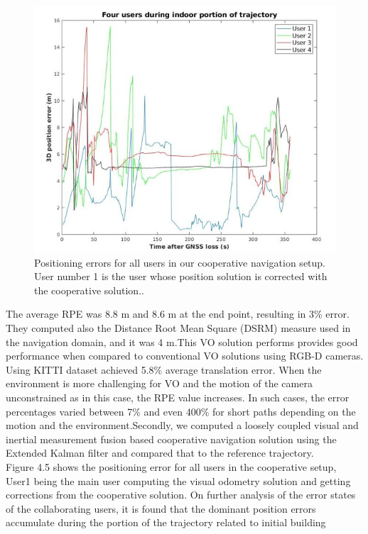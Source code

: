 \begin{figure}
    \centering
    \includegraphics{fig15.jpg}
    \caption{Positioning errors for all users in our cooperative navigation
setup. User number 1 is the user whose position solution is corrected
with the cooperative solution..}
\end{figure}
The
average RPE was 8.8 m and 8.6 m at the end point, resulting
in 3\% error. They computed also the Distance Root Mean
Square (DSRM) measure used in the navigation domain, and
it was 4 m.This VO solution performs provides good performance
when compared to conventional VO solutions using RGB-D
cameras. Using KITTI dataset achieved 5.8\% average
translation error. When the environment is more challenging
for VO and the motion of the camera unconstrained as in
this case, the RPE value increases. In such cases, the error percentages varied between 7\% and even 400\% for short paths
depending on the motion and the environment.Secondly, we computed a loosely coupled visual and inertial
measurement fusion based cooperative navigation solution
using the Extended Kalman filter and
compared that to the reference trajectory.\\
Figure 4.5 shows the positioning error for all users in the cooperative setup,
User1 being the main user computing the visual odometry
solution and getting corrections from the cooperative solution.
On further analysis of the error states of the collaborating
users, it is found that the dominant position errors accumulate
during the portion of the trajectory related to initial building
